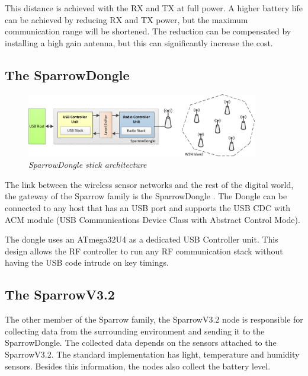 This distance is achieved with the RX and TX at full power. A higher battery life can be achieved by reducing RX and TX power, but the maximum communication range will be shortened. The reduction can be compensated by installing a high gain antenna, but this can significantly increase the cost.

\subsection{The SparrowDongle}

\begin{figure}[ht]
\begin{center}
\includegraphics[width=0.9\textwidth]{img/donge_architecture.png}
\end{center}
\caption{\small \itshape{SparrowDongle stick architecture}}
\end{figure}
 
The link between the wireless sensor networks and the rest of the digital world, the gateway of the Sparrow family is the SparrowDongle . The Dongle can be connected to any host that has an USB port and supports the USB CDC with ACM module (USB Communications Device Class with Abstract Control Mode). 

The dongle uses an ATmega32U4 as a dedicated USB Controller unit. This design allows the RF controller to run any RF communication stack without having the USB code intrude on key timings.\cite{voinescu2013lightweight}


\subsection{The SparrowV3.2}
 
 
The other member of the Sparrow family, the SparrowV3.2 node is responsible for collecting data from the surrounding environment and sending it to the SparrowDongle. The collected data depends on the sensors attached to the SparrowV3.2. The standard implementation has light, temperature and humidity sensors. Besides this information, the nodes also collect the battery level.

